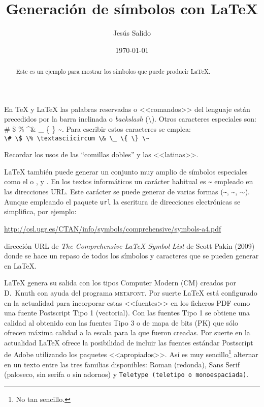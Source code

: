 \documentclass[11pt,a4paper]{article}
\title{Generación de símbolos con \LaTeX}
\author{Jesús Salido}
\date{\today}
\begin{document}
\maketitle


\begin{abstract}
	Este es un ejemplo para mostrar los símbolos que puede producir \LaTeX.
\end{abstract}


\setcounter{page}{25}


En \TeX{} y \LaTeX{} las palabras reservadas o <<comandos>> del lenguaje están precedidos por la barra inclinada o \emph{backslash} (\textbackslash). Otros caracteres especiales son: \# \$ \% \textasciicircum \& \_ \{ \} \~{}. Para escribir estos caracteres se emplea:\\
\verb!\# \$ \% \textasciicircum \& \_ \{ \} \~!

Recordar los usos de las ``comillas dobles'' y las <<latinas>>.

\LaTeX{} también puede generar un conjunto muy amplio de símbolos especiales como el \EUR{} o \texteuro,  y \Coffeecup. En los textos informáticos un carácter habitual es \verb+~+ empleado en las direcciones URL. Este carácter se puede generar de varias formas (\verb+~+, \~{}, $\sim$). Aunque empleando el paquete \texttt{url} la escritura de direcciones electrónicas se simplifica, por ejemplo:

\url{http://osl.ugr.es/CTAN/info/symbols/comprehensive/symbols-a4.pdf}

\noindent dirección URL de \emph{The Comprehensive \LaTeX{} Symbol List} de Scott Pakin (2009) donde se hace un repaso de todos los símbolos y caracteres que se pueden generar en \LaTeX{}.

\LaTeX{} genera su salida con los tipos Computer Modern (CM) creados por D.~Knuth con ayuda del programa \textsc{metafont}. Por suerte \LaTeX{} está configurado en la actualidad para incorporar estas <<fuentes>> en los ficheros PDF como una fuente Postscript Tipo 1 (vectorial). Con las fuentes Tipo 1 se obtiene una calidad al obtenido con las fuentes Tipo 3 o de mapa de bits (PK) que sólo ofrecen máxima calidad a la escala para la que fueron creadas. Por suerte en la actualidad \LaTeX{} ofrece la posibilidad de incluir las fuentes estándar Postscript de Adobe utilizando los paquetes <<apropiados>>. Así es muy sencillo\footnote{No tan sencillo.} alternar en un texto entre las tres familias disponibles: Roman (redonda), \textsf{Sans Serif (paloseco, sin serifa o sin adornos)} y \texttt{Teletype (teletipo o monoespaciada)}. 
\end{document}
